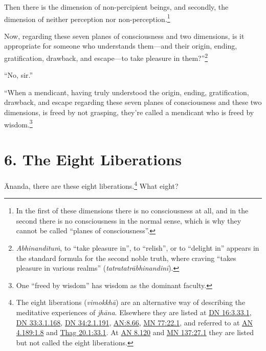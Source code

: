 \documentclass[12pt,openany]{book}%
\begin{document}
Then there is the dimension of non-percipient beings, and secondly, the dimension of neither perception nor non-perception.\footnote{In the first of these dimensions there is no consciousness at all, and in the second there is no consciousness in the normal sense, which is why they cannot be called “planes of consciousness”. } 

Now, regarding these seven planes of consciousness and two dimensions, is it appropriate for someone who understands them—and their origin, ending, gratification, drawback, and escape—to take pleasure in them?”\footnote{\textit{\textsanskrit{Abhinandituṁ}}, to “take pleasure in”, to “relish”, or to “delight in” appears in the standard formula for the second noble truth, where craving “takes pleasure in various realms” (\textit{\textsanskrit{tatratatrābhinandinī}}). } 

“No, sir.” 

“When a mendicant, having truly understood the origin, ending, gratification, drawback, and escape regarding these seven planes of consciousness and these two dimensions, is freed by not grasping, they’re called a mendicant who is freed by wisdom.\footnote{One “freed by wisdom” has wisdom as the dominant faculty. } 

\section*{6. The Eight Liberations }

Ānanda, there are these eight liberations.\footnote{The eight liberations (\textit{\textsanskrit{vimokkhā}}) are an alternative way of describing the meditative experiences of \textit{\textsanskrit{jhāna}}. Elsewhere they are listed at \href{https://suttacentral.net/dn16/en/sujato\#3.33.1}{DN 16:3.33.1}, \href{https://suttacentral.net/dn33/en/sujato\#3.1.168}{DN 33:3.1.168}, \href{https://suttacentral.net/dn34/en/sujato\#2.1.191}{DN 34:2.1.191}, \href{https://suttacentral.net/an/en/sujato\#8.66}{AN:8.66}, \href{https://suttacentral.net/mn77/en/sujato\#22.1}{MN 77:22.1}, and referred to at \href{https://suttacentral.net/an4.189/en/sujato\#1.8}{AN 4.189:1.8} and \href{https://suttacentral.net/thag20.1/en/sujato\#33.1}{Thag 20.1:33.1}. At \href{https://suttacentral.net/an8.120/en/sujato}{AN 8.120} and \href{https://suttacentral.net/mn137/en/sujato\#27.1}{MN 137:27.1} they are listed but not called the eight liberations. } What eight? 
\end{document}
